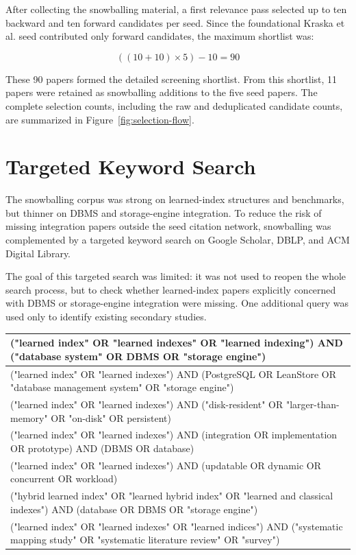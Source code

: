 \documentclass[a4paper, 12pt, twoside]{report}
\begin{document}
After collecting the snowballing material, a first relevance pass selected up to ten backward and ten forward candidates per seed. Since the foundational Kraska et al. seed contributed only forward candidates, the maximum shortlist was:

\[
((10 + 10) \times 5) - 10 = 90
\]

These 90 papers formed the detailed screening shortlist. From this shortlist, 11 papers were retained as snowballing additions to the five seed papers. The complete selection counts, including the raw and deduplicated candidate counts, are summarized in Figure~\ref{fig:selection-flow}.

\section{Targeted Keyword Search}

The snowballing corpus was strong on learned-index structures and benchmarks, but thinner on DBMS and storage-engine integration. To reduce the risk of missing integration papers outside the seed citation network, snowballing was complemented by a targeted keyword search on Google Scholar, DBLP, and ACM Digital Library.

The goal of this targeted search was limited: it was not used to reopen the whole search process, but to check whether learned-index papers explicitly concerned with DBMS or storage-engine integration were missing. One additional query was used only to identify existing secondary studies.

\begin{center}
\begin{tabular}{|p{12.5cm}|}
\hline
\small\ttfamily ("learned index" OR "learned indexes" OR "learned indexing") AND ("database system" OR DBMS OR "storage engine") \\
\hline
\small\ttfamily ("learned index" OR "learned indexes") AND (PostgreSQL OR LeanStore OR "database management system" OR "storage engine") \\
\hline
\small\ttfamily ("learned index" OR "learned indexes") AND ("disk-resident" OR "larger-than-memory" OR "on-disk" OR persistent) \\
\hline
\small\ttfamily ("learned index" OR "learned indexes") AND (integration OR implementation OR prototype) AND (DBMS OR database) \\
\hline
\small\ttfamily ("learned index" OR "learned indexes") AND (updatable OR dynamic OR concurrent OR workload) \\
\hline
\small\ttfamily ("hybrid learned index" OR "learned hybrid index" OR "learned and classical indexes") AND (database OR DBMS OR "storage engine") \\
\hline
\small\ttfamily ("learned index" OR "learned indexes" OR "learned indices") AND ("systematic mapping study" OR "systematic literature review" OR "survey") \\
\hline
\end{tabular}
\end{center}
\end{document}
